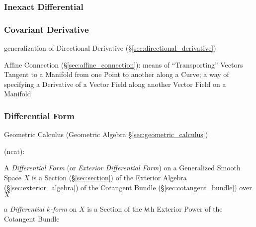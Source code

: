 \subsubsection{Inexact Differential}\label{sec:inexact_differential}

\subsubsection{Covariant Derivative}\label{sec:covariant_derivative}

generalization of Directional Derivative (\S\ref{sec:directional_derivative})

\fist Affine Connection (\S\ref{sec:affine_connection}): means of
``Transporting'' Vectors Tangent to a Manifold from one Point to another along
a Curve; a way of specifying a Derivative of a Vector Field along another
Vector Field on a Manifold



\subsubsection{Differential Form}\label{sec:differential_form}

\fist Geometric Calculus (Geometric Algebra \S\ref{sec:geometric_calculus})

(ncat):

A \emph{Differential Form} (or \emph{Exterior Differential Form}) on a
Generalized Smooth Space $X$ is a Section (\S\ref{sec:section}) of the Exterior
Algebra (\S\ref{sec:exterior_algebra}) of the Cotangent Bundle
(\S\ref{sec:cotangent_bundle}) over $X$

a \emph{Differential $k$-form} on $X$ is a Section of the $k$th Exterior Power
of the Cotangent Bundle

